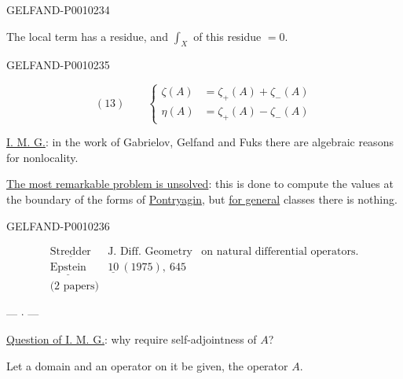 \begin{GelfandAdjacentEvidence}{GELFAND-P001023}{4}


The local term has a residue, and $\displaystyle\int_X$ of this residue $=0$.
\end{GelfandAdjacentEvidence}
\begin{GelfandAdjacentEvidence}{GELFAND-P001023}{5}


\[
(13)\qquad
\left\{
\begin{aligned}
\zeta(A)&=\zeta_+(A)+\zeta_-(A)\\
\eta(A)&=\zeta_+(A)-\zeta_-(A)
\end{aligned}
\right.
\]

\underline{I. M. G.}: in the work of Gabrielov, Gelfand and Fuks there are algebraic reasons for nonlocality.

\underline{The most remarkable problem is unsolved}: this is done to compute the values at the boundary of the forms of
\underline{Pontryagin}, but \underline{for general} classes there is nothing.
\end{GelfandAdjacentEvidence}
\begin{GelfandAdjacentEvidence}{GELFAND-P001023}{6}


\[
\begin{array}{l|l|l}
\underline{\text{Stredder}}&\text{J. Diff. Geometry}&\text{on natural differential operators.}\\
\underline{\text{Epstein}}&\underline{10}\ (1975),\ 645&\\
\text{(2 papers)}&&
\end{array}
\]

\begin{center}--- $\cdot$ ---\end{center}

\underline{Question of I. M. G.}: why require self-adjointness of $A$?

Let a domain and an operator on it be given, the operator $A$.

\end{GelfandAdjacentEvidence}
